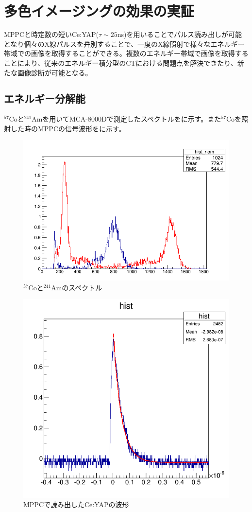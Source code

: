 \chapter{多色イメージングの効果の実証}      
MPPCと時定数の短いCe:YAP($\tau\sim25$ns)を用いることでパルス読み出しが可能となり個々のX線パルスを弁別することで、一度のX線照射で様々なエネルギー帯域での画像を取得することができる。複数のエネルギー帯域で画像を取得することにより、従来のエネルギー積分型のCTにおける問題点を解決できたり、新たな画像診断が可能となる。

\section{エネルギー分解能}
$^{57}$Coと$^{241}$Amを用いてMCA-8000Dで測定したスペクトルをに示す。また$^{57}$Coを照射した時のMPPCの信号波形をに示す。

\begin{figure}[H]
 \begin{center}
 \includegraphics[bb=0.000000 0.000000 696.000000 474.000000,width=0.6\hsize]{image2/chapter5/241Am_57Co_Gain5_000_100ns.png} 
 \end{center}
 \caption{$^{57}$Coと$^{241}$Amのスペクトル}
 \label{fig:57Co_241Am}
\end{figure}

\begin{figure}[H]
 \begin{center}
 \includegraphics[bb=0.000000 0.000000 596.000000 574.000000,width=0.5\hsize]{image2/chapter5/YAP_MPPCsignal.png} 
 \end{center}
 \caption{MPPCで読み出したCe:YAPの波形}
 \label{fig:YAP_waveform}
\end{figure}

